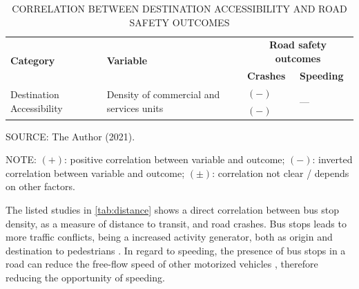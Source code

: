 \begin{table}[!hbtp]
    \footnotesize
    \captionsetup{justification=raggedright,
        singlelinecheck=false,
        font=footnotesize}
    \caption{CORRELATION BETWEEN DESTINATION ACCESSIBILITY AND ROAD SAFETY OUTCOMES}
    \centering
    \begin{tabular}{p{4cm}p{4cm}p{4cm}p{2cm}}
        \hline
        \multirow{2}{4cm}{\textbf{Category}} & \multirow{2}{4cm}{\textbf{Variable}} & \multicolumn{2}{c}{\textbf{Road safety outcomes}} \\
         &  & \textbf{Crashes} & \textbf{Speeding} \\ \hline
        \multirow{3}{4cm}{Destination Accessibility} & \multirow{3}{4cm}{Density of commercial and services units} & $(-)$ \textcite{Ouyang2014} & \multirow{2}{2cm}{---} \\
         &  & $(-)$ \textcite{Welle2016} &  \\ \hline
    \end{tabular}
    \label{tab:destination}
    \par \vspace{2mm} \footnotesize \raggedright
    SOURCE: The Author (2021).
    \par \vspace{1mm} \footnotesize \raggedright
    NOTE: $(+)$: positive correlation between variable and outcome; $(-)$: inverted correlation between variable and outcome; $(\pm)$: correlation not clear / depends on other factors.
\end{table}

The listed studies in \autoref{tab:distance} shows a direct correlation between bus stop density, as a measure of distance to transit, and road crashes. Bus stops leads to more traffic conflicts, being a increased activity generator, both as origin and destination to pedestrians \cite{Kim2010}. In regard to speeding, the presence of bus stops in a road can reduce the free-flow speed of other motorized vehicles \cite{Bansal2014, Koshy2005}, therefore reducing the opportunity of speeding. 

